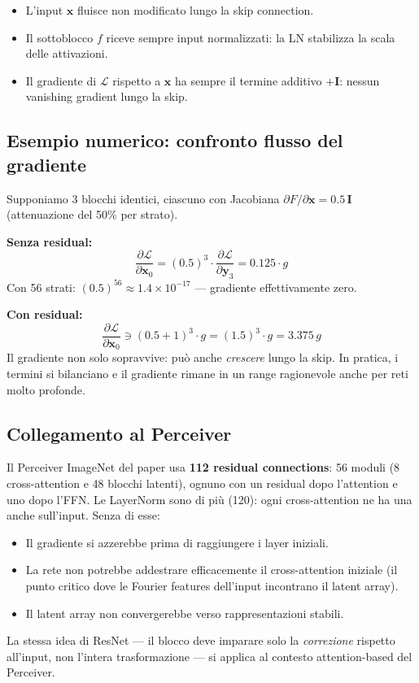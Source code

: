 \documentclass[
  11pt,
]{article}
\begin{document}
\begin{itemize}
  \item L'input $\mathbf{x}$ fluisce non modificato lungo la skip connection.
  \item Il sottoblocco $f$ riceve sempre input normalizzati: la LN stabilizza la scala delle attivazioni.
  \item Il gradiente di $\mathcal{L}$ rispetto a $\mathbf{x}$ ha sempre il termine additivo $+\mathbf{I}$: nessun vanishing gradient lungo la skip.
\end{itemize}

\subsection{Esempio numerico: confronto flusso del gradiente}

\begin{notabox}[title={\textbf{Esempio: 3 strati, gradiente senza e con residual}}]
Supponiamo 3 blocchi identici, ciascuno con Jacobiana $\partial F / \partial \mathbf{x} = 0.5\,\mathbf{I}$ (attenuazione del 50\% per strato).

\textbf{Senza residual:}
\[
\frac{\partial \mathcal{L}}{\partial \mathbf{x}_0} = (0.5)^3 \cdot \frac{\partial \mathcal{L}}{\partial \mathbf{y}_3} = 0.125 \cdot g
\]
Con 56 strati: $(0.5)^{56} \approx 1.4 \times 10^{-17}$ --- gradiente effettivamente zero.

\textbf{Con residual:}
\[
\frac{\partial \mathcal{L}}{\partial \mathbf{x}_0} \ni (0.5 + 1)^3 \cdot g = (1.5)^3 \cdot g = 3.375\,g
\]
Il gradiente non solo sopravvive: può anche \emph{crescere} lungo la skip. In pratica, i termini si bilanciano e il gradiente rimane in un range ragionevole anche per reti molto profonde.
\end{notabox}

\subsection{Collegamento al Perceiver}

\begin{notabox}[title={\textbf{Residual connections nel Perceiver}}]
Il Perceiver ImageNet del paper usa \textbf{112 residual connections}: 56 moduli (8 cross-attention e 48 blocchi latenti), ognuno con un residual dopo l'attention e uno dopo l'FFN. Le LayerNorm sono di più (120): ogni cross-attention ne ha una anche sull'input. Senza di esse:
\begin{itemize}
  \item Il gradiente si azzerebbe prima di raggiungere i layer iniziali.
  \item La rete non potrebbe addestrare efficacemente il cross-attention iniziale (il punto critico dove le Fourier features dell'input incontrano il latent array).
  \item Il latent array non convergerebbe verso rappresentazioni stabili.
\end{itemize}
La stessa idea di ResNet --- il blocco deve imparare solo la \emph{correzione} rispetto all'input, non l'intera trasformazione --- si applica al contesto attention-based del Perceiver.
\end{notabox}
\end{document}

